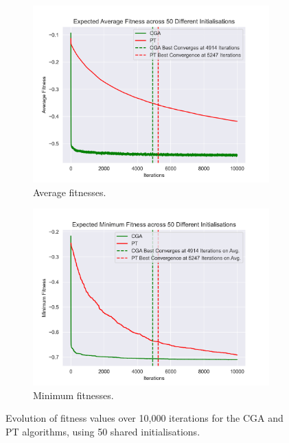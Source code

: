 \documentclass[10pt]{article}
\begin{document}
\begin{multicols}{2}
\begin{figure}[H]
    \centering
    \begin{subfigure}{0.48\textwidth}
        \includegraphics[width=\textwidth]{../figures/Final Comparison/CGA vs PT Average Fitness.png}
        \caption{Average fitnesses.}
        \label{fig:AVG_final_fitness}
    \end{subfigure}
    \begin{subfigure}{0.48\textwidth}
        \includegraphics[width=\textwidth]{../figures/Final Comparison/CGA vs PT Minimum Fitness.png}
        \caption{Minimum fitnesses.}
        \label{fig:MIN_final_fitness}
    \end{subfigure}
\captionsetup{justification=centering}
\caption{Evolution of fitness values over 10,000 iterations for the CGA and PT algorithms, using 50 shared initialisations.}
\label{fig:final_fitness}
\end{figure}


\end{multicols}
\end{document}
